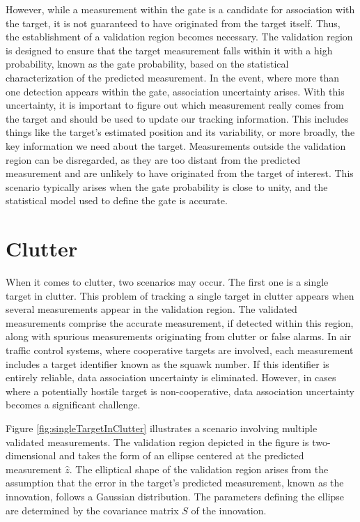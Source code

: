 However, while a measurement within the gate is a candidate for association with the target, it is not guaranteed to
have originated from the target itself. Thus, the establishment of a validation region becomes necessary. The
validation region is designed to ensure that the target measurement falls within it with a high probability, known as
the gate probability, based on the statistical characterization of the predicted measurement. In the event, where more
than one detection appears within the gate, association uncertainty arises. With this uncertainty, it is important to
figure out which measurement really comes from the target and should be used to update our tracking information. This includes things like the target's estimated position and its variability, or more broadly, the key information we need about the target. Measurements outside the validation region can be disregarded, as they are too distant from the predicted measurement and are unlikely to have originated from the target of interest. This scenario typically arises when the gate probability is close to unity, and the statistical model used to define the gate is accurate.
\section{Clutter}
When it comes to clutter, two scenarios may occur. The first one is a single target in clutter. This problem of
tracking a single target in clutter appears when several measurements appear in the validation region. The
validated measurements comprise the accurate measurement, if detected within this region, along with spurious
measurements originating from clutter or false alarms. In air traffic control systems, where cooperative targets are
involved, each measurement includes a target identifier known as the squawk number. If this identifier is entirely
reliable, data association uncertainty is eliminated. However, in cases where a potentially hostile target is non-cooperative, data association uncertainty becomes a significant challenge.

Figure \ref{fig:singleTargetInClutter} illustrates a scenario involving multiple validated measurements. The validation region depicted in the
figure is two-dimensional and takes the form of an ellipse centered at the predicted measurement $\hat{z}$. The
elliptical shape of the validation region arises from the assumption that the error in the target's predicted
measurement, known as the innovation, follows a Gaussian distribution. The parameters defining the ellipse are
determined by the covariance matrix $S$ of the innovation.

